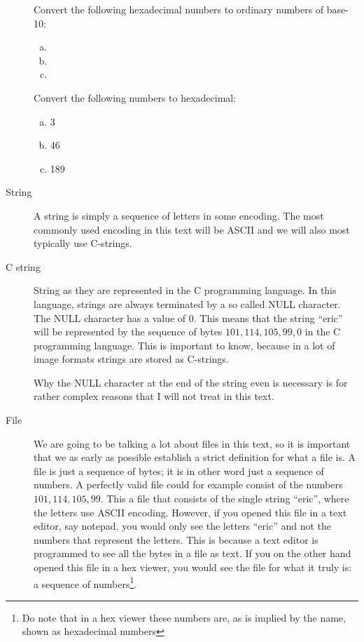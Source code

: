 \begin{description}
  \begin{Exercise}[label={hex-to-n}]
    Convert the following hexadecimal numbers to ordinary numbers of
    base-10:

    \begin{enumerate}[(a)]
    \item {}
    \item {}
    \item {}
    \end{enumerate}

  \end{Exercise}

  \begin{Exercise}[label={n-to-hex}]
    Convert the following numbers to hexadecimal:

    \begin{enumerate}[(a)]
    \item 3
    \item 46
    \item 189
    \end{enumerate}

  \end{Exercise}

\item[String] A string is simply a sequence of letters in some
  encoding. The most commonly used encoding in this text will be
  ASCII \cite{rfc20} and we will also most typically use C-strings.

\item[C string] String as they are represented in the C programming
  language. In this language, strings are always terminated by a so
  called NULL character. The NULL character has a value of
  $0$\cite{kernighan1988c}. This means that the string ``eric'' will
  be represented by the sequence of bytes $101,114,105,99, 0$ in the C
  programming language. This is important to know, because in a lot of
  image formats strings are stored as C-strings.

  Why the NULL character at the end of the string even is necessary is
  for rather complex reasons that I will not treat in this text.

\item[File] We are going to be talking a lot about files in this text,
  so it is important that we as early as possible establish a strict
  definition for what a file is. A file is just a sequence of bytes;
  it is in other word just a sequence of numbers. A perfectly valid
  file could for example consist of the numbers $101,114,105,99$. This
  a file that consists of the single string ``eric'', where the
  letters use ASCII encoding. However, if you opened this file in a
  text editor, say notepad, you would only see the letters ``eric''
  and not the numbers that represent the letters. This is because a
  text editor is programmed to see all the bytes in a file as text. If
  you on the other hand opened this file in a hex viewer, you would
  see the file for what it truly is: a sequence of numbers\footnote{Do
    note that in a hex viewer these numbers are, as is implied by the
    name, shown as hexadecimal numbers}.



\end{description}

